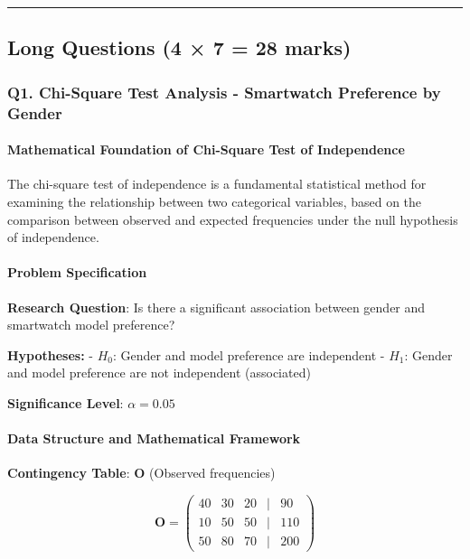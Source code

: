 \documentclass[11pt]{article}
\begin{document}
    \begin{center}\rule{0.5\linewidth}{0.5pt}\end{center}

\subsection{Long Questions (4 × 7 = 28
marks)}\label{long-questions-4-7-28-marks}

\subsubsection{Q1. Chi-Square Test Analysis - Smartwatch Preference by
Gender}\label{q1.-chi-square-test-analysis---smartwatch-preference-by-gender}

\paragraph{Mathematical Foundation of Chi-Square Test of
Independence}\label{mathematical-foundation-of-chi-square-test-of-independence}

The chi-square test of independence is a fundamental statistical method
for examining the relationship between two categorical variables, based
on the comparison between observed and expected frequencies under the
null hypothesis of independence.

\paragraph{Problem Specification}\label{problem-specification}

\textbf{Research Question}: Is there a significant association between
gender and smartwatch model preference?

\textbf{Hypotheses:} - \(H_0\): Gender and model preference are
independent - \(H_1\): Gender and model preference are not independent
(associated)

\textbf{Significance Level}: \(\alpha = 0.05\)

\paragraph{Data Structure and Mathematical
Framework}\label{data-structure-and-mathematical-framework}

\textbf{Contingency Table}: \(\mathbf{O}\) (Observed frequencies)

\[\mathbf{O} = \begin{pmatrix}
40 & 30 & 20 & | & 90 \\
10 & 50 & 50 & | & 110 \\
\hline
50 & 80 & 70 & | & 200
\end{pmatrix}\]
\end{document}
